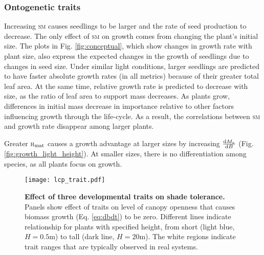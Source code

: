 \documentclass[9pt,twocolumn,twoside,lineno]{pnas-new}
\newcommand{\seed}{\textsc{sm}}
\newcommand{\hmat}{\textsc{h}$_{\rm mat}$}
\begin{document}
\subsubsection*{Ontogenetic traits}  Increasing {\seed} causes seedlings to be larger and the rate of seed production to decrease. The only effect of {\seed} on growth comes from changing the plant's initial size. The plots in Fig. \ref{fig:conceptual}, which show changes in growth rate with plant size, also express the expected changes in the growth of seedlings due to changes in seed size. Under similar light conditions, larger seedlings are predicted to have faster absolute growth rates (in all metrics) because of their greater total leaf area. At the same time, relative growth rate is predicted to decrease with size, as the ratio of leaf area to support mass decreases. As plants grow, differences in initial mass decrease in importance relative to other factors influencing growth through the life-cycle. As a result, the correlations between {\seed} and growth rate disappear among larger plants.

Greater {\hmat} causes a growth advantage at larger sizes by increasing $\frac{{\rm d}M_{\rm a}}{{\rm d}B}$ (Fig. \ref{fig:growth_light_height}). At smaller sizes, there is no differentiation among species, as all plants focus on growth.

\begin{SCfigure*}[\sidecaptionrelwidth][b]
\centering
\texttt{[image: lcp\_trait.pdf]}
\caption{\textbf{Effect of three developmental traits on shade tolerance.}
Panels show effect of traits on level of canopy openness that causes biomass growth (Eq. \ref{eq:dbdt}) to be zero. Different lines indicate relationship for plants with specified height, from short (light blue,  $H=0.5$m) to tall (dark line, $H=20$m). The white regions indicate trait ranges that are typically observed in real systems.
\label{fig:wplcp}}
\end{SCfigure*}
\end{document}

